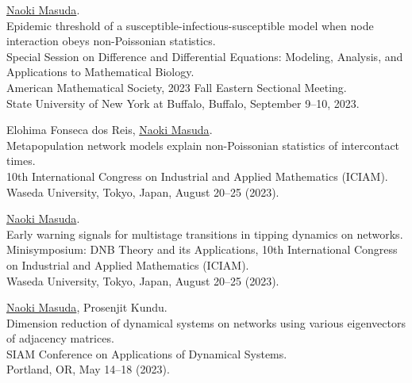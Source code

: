 \documentclass[11pt,letter]{article}
\begin{document}
\begin{etaremune}
\item \underline{Naoki Masuda}.\\
Epidemic threshold of a susceptible-infectious-susceptible model when node interaction obeys non-Poissonian statistics.\\
Special Session on Difference and Differential Equations: Modeling, Analysis, and Applications to Mathematical Biology.\\
American Mathematical Society, 2023 Fall Eastern Sectional Meeting.\\
State University of New York at Buffalo, Buffalo, September 9--10, 2023. 

\item Elohima Fonseca dos Reis, \underline{Naoki Masuda}.\\
Metapopulation network models explain non-Poissonian statistics of intercontact times.\\
10th International Congress on Industrial and Applied Mathematics (ICIAM).\\
Waseda University, Tokyo, Japan, August 20--25 (2023).

\item \underline{Naoki Masuda}.\\
Early warning signals for multistage transitions in tipping dynamics on networks.\\
Minisymposium: DNB Theory and its Applications,
10th International Congress on Industrial and Applied Mathematics (ICIAM).\\
Waseda University, Tokyo, Japan, August 20--25 (2023).


\item \underline{Naoki Masuda}, Prosenjit Kundu.\\
Dimension reduction of dynamical systems on networks using various eigenvectors of adjacency matrices.\\
SIAM Conference on Applications of Dynamical Systems.\\
Portland, OR, May 14--18 (2023).


\end{etaremune}
\end{document}
